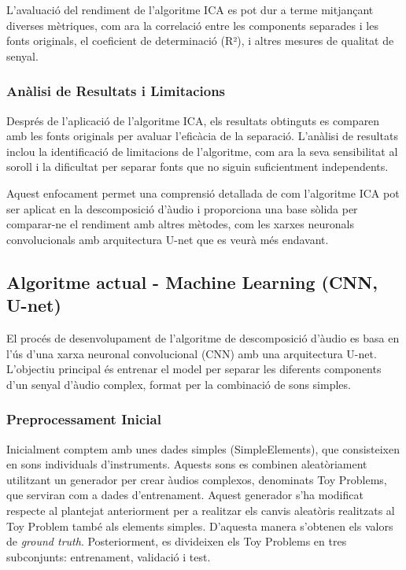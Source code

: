 \documentclass[10pt,a4paper,twocolumn,twoside]{article}
\begin{document}
L'avaluació del rendiment de l'algoritme ICA es pot dur a terme mitjançant diverses mètriques, com ara la correlació entre les components separades i les fonts originals, el coeficient de determinació (R²), i altres mesures de qualitat de senyal.

\subsubsection{Anàlisi de Resultats i Limitacions}

Després de l'aplicació de l'algoritme ICA, els resultats obtinguts es comparen amb les fonts originals per avaluar l'eficàcia de la separació. L'anàlisi de resultats inclou la identificació de limitacions de l'algoritme, com ara la seva sensibilitat al soroll i la dificultat per separar fonts que no siguin suficientment independents.

Aquest enfocament permet una comprensió detallada de com l'algoritme ICA pot ser aplicat en la descomposició d'àudio i proporciona una base sòlida per comparar-ne el rendiment amb altres mètodes, com les xarxes neuronals convolucionals amb arquitectura U-net que es veurà més endavant.

\subsection{Algoritme actual - Machine Learning (CNN, U-net)}

El procés de desenvolupament de l'algoritme de descomposició d'àudio es basa en l'ús d'una xarxa neuronal convolucional (CNN) amb una arquitectura U-net. L'objectiu principal és entrenar el model per separar les diferents components d'un senyal d'àudio complex, format per la combinació de sons simples.

\subsubsection{Preprocessament Inicial}

Inicialment comptem amb unes dades simples (SimpleElements), que consisteixen en sons individuals d'instruments. Aquests sons es combinen aleatòriament utilitzant un generador per crear àudios complexos, denominats Toy Problems, que serviran com a dades d'entrenament. Aquest generador s'ha modificat respecte al plantejat anteriorment per a realitzar els canvis aleatòris realitzats al Toy Problem també als elements simples. D'aquesta manera s'obtenen els valors de \textit{ground truth}. Posteriorment, es divideixen els Toy Problems en tres subconjunts: entrenament, validació i test.
\end{document}
